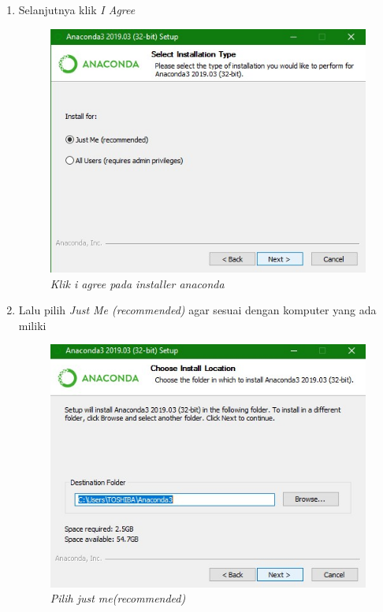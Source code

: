 \begin{enumerate}
\item Selanjutnya klik \textit{I Agree}

\begin{figure}[!htbp]
    \centering
    \includegraphics[scale=0.6]{gambar/3.jpg}
    \caption{\textit{Klik i agree pada installer anaconda}}
    \label{Figure3}
\end{figure}


\item Lalu pilih \textit{Just Me (recommended)} agar sesuai dengan komputer yang ada miliki

\begin{figure}[!htbp]
    \centering
    \includegraphics[scale=0.6]{gambar/4.jpg}
    \caption{\textit{Pilih just me(recommended)}}
    \label{Figure4}
\end{figure}



\end{enumerate}
